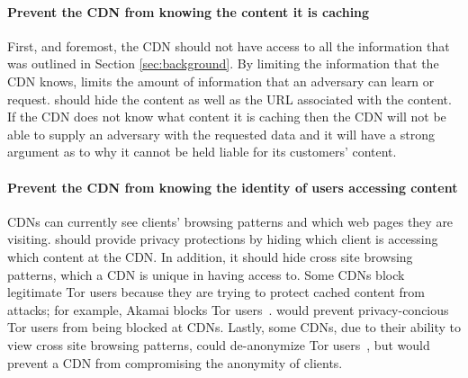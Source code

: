 
\paragraph{Prevent the CDN from knowing the content it is caching} First, and foremost, the CDN 
should not have access to all the information that was outlined 
in Section \ref{sec:background}.  By limiting the information that the CDN knows, \system{} limits 
the amount of information that an adversary can learn or request.  \system{} should hide 
the content as well as the URL associated with the content.  If the CDN 
does not know what content it is caching then the CDN will not be able to supply an adversary 
with the requested data and it will have a strong argument as to why it cannot be held 
liable for its customers' content.

\paragraph{Prevent the CDN from knowing the identity of users accessing content} CDNs can currently see clients' 
browsing patterns and which web pages they are visiting. \system{} should provide privacy protections by hiding which client is accessing 
which content at the CDN.  In addition, it should hide cross site browsing patterns, which a CDN 
is unique in having access to.  Some CDNs block legitimate Tor users because they are 
trying to protect cached content from attacks; for example, Akamai blocks Tor users~\cite{khattak2016you}.    \system{} would prevent 
privacy-concious Tor users from being blocked at CDNs.  Lastly, some CDNs, due to their ability 
to view cross site browsing patterns, could de-anonymize Tor users~\cite{cloudflare_tor}, but \system{} would 
prevent a CDN from compromising the anonymity of clients.

